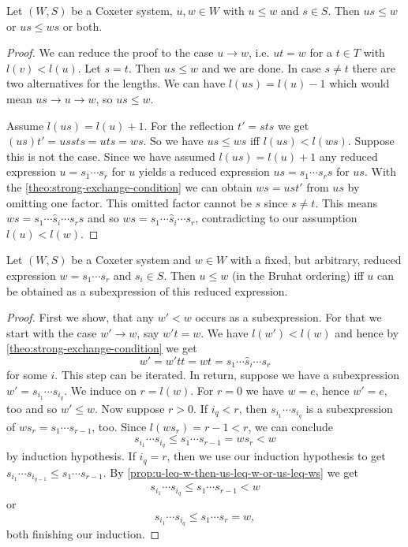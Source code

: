 \begin{prop}
	Let $(W,S)$ be a Coxeter system, $u,w \in W$ with $u \leq w$ and $s \in S$. Then $us \leq w$ or $us \leq ws$ or both.

	\begin{proof}
		We can reduce the proof to the case $u \to w$, i.e. $ut = w$ for a $t \in T$ with $l(v) < l(u)$. Let $s = t$. Then $us \leq w$ and we are done. In case $s \neq t$ there are two alternatives for the lengths. We can have $l(us) = l(u) - 1$ which would mean $us \to u \to w$, so $us \leq w$.

		Assume $l(us) = l(u) + 1$. For the reflection $t' = sts$ we get $(us)t' = ussts = uts = ws$. So we have $us \leq ws$ iff $l(us) < l(ws)$. Suppose this is not the case. Since we have assumed $l(us) = l(u) + 1$ any reduced expression $u = s_1 \cdots s_r$ for $u$ yields a reduced expression $us = s_1 \cdots s_r s$ for $us$. With the \ref{theo:strong-exchange-condition} we can obtain $ws = ust'$ from $us$ by omitting one factor. This omitted factor cannot be $s$ since $s \neq t$. This means $ws = s_1 \cdots \hat s_i \cdots s_r s$ and so $ws = s_1 \cdots \hat s_i \cdots s_r$, contradicting to our assumption $l(u) < l(w)$.
	\end{proof}
\end{prop}

\begin{theo}
	Let $(W,S)$ be a Coxeter system and $w \in W$ with a fixed, but arbitrary, reduced expression $w = s_1 \cdots s_r$ and $s_i \in S$. Then $u \leq w$ (in the Bruhat ordering) iff $u$ can be obtained as a subexpression of this reduced expression.

	\begin{proof}
		First we show, that any $w' < w$ occurs as a subexpression. For that we start with the case $w' \to w$, say $w't = w$. We have $l(w') < l(w)$ and hence by \ref{theo:strong-exchange-condition} we get
		$$ w' = w'tt = wt = s_1 \cdots \hat s_i \cdots s_r $$
		for some $i$. This step can be iterated. In return, suppose we have a subexpression $w' = s_{i_1} \cdots s_{i_q}$. We induce on $r = l(w)$. For $r = 0$ we have $w = e$, hence $w' = e$, too and so $w' \leq w$. Now suppose $r > 0$. If $i_q < r$, then $s_{i_1} \cdots s_{i_q}$ is a subexpression of $w s_r = s_1 \cdots s_{r-1}$, too. Since $l(w s_r) = r-1 < r$, we can conclude
		$$ s_{i_1} \cdots s_{i_q} \leq s_1 \cdots s_{r-1} = w s_r < w $$
		by induction hypothesis. If $i_q = r$, then we use our induction hypothesis to get $s_{i_1} \cdots s_{i_{q-1}} \leq s_1 \cdots s_{r-1}$. By \ref{prop:u-leq-w-then-us-leq-w-or-us-leq-ws} we get
		$$ s_{i_1} \cdots s_{i_q} \leq s_1 \cdots s_{r-1} < w $$
		or
		$$ s_{i_1} \cdots s_{i_q} \leq s_1 \cdots s_r = w, $$
		both finishing our induction.
	\end{proof}
\end{theo}

